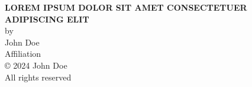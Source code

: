 \thispagestyle{empty}

\vspace*{1in}

\begin{center}
{\large \MakeUppercase{\textbf{Lorem ipsum dolor sit amet consectetuer adipiscing elit}}}
%
%
\\ \vspace{2in}
%
%
by \\
John Doe \\                     %
Affiliation                     %
%
%
\\ \vspace{2in}
%
%
{\copyright{} 2024 John Doe \\
All rights reserved}


\end{center}
